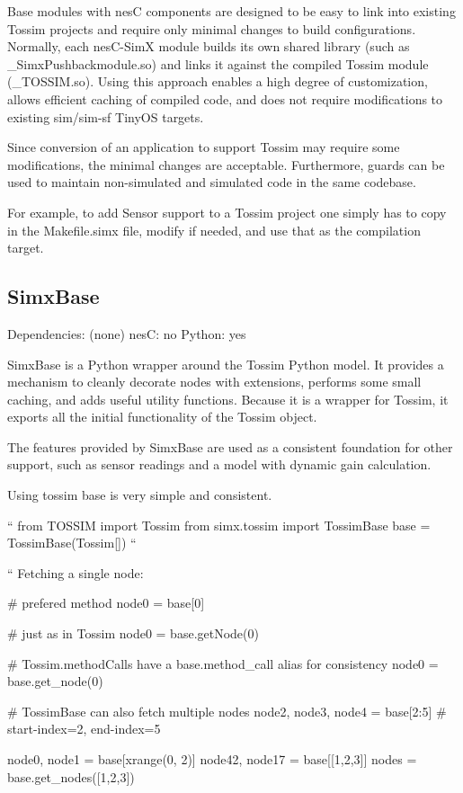 Base modules with nesC components are designed to be easy to link into
existing Tossim projects and require only minimal changes to build
configurations. Normally, each nesC-SimX module builds its own shared
library (such as \_SimxPushbackmodule.so) and links it against the
compiled Tossim module (\_TOSSIM.so). Using this approach enables a
high degree of customization, allows efficient caching of compiled
code, and does not require modifications to existing sim/sim-sf TinyOS
targets.

Since conversion of an application to support Tossim may require some
modifications, the minimal changes are acceptable. Furthermore, guards
can be used to maintain non-simulated and simulated code in the same
codebase.

For example, to add Sensor support to a Tossim project one simply has
to copy in the Makefile.simx file, modify if needed, and use that as
the compilation target.

\subsection{SimxBase}

Dependencies: (none)
nesC: no
Python: yes

SimxBase is a Python wrapper around the Tossim Python model. It
provides a mechanism to cleanly decorate nodes with extensions,
performs some small caching, and adds useful utility
functions. Because it is a wrapper for Tossim, it exports all the
initial functionality of the Tossim object.

The features provided by SimxBase are used as a consistent foundation
for other support, such as sensor readings and a model with dynamic
gain calculation.

Using tossim base is very simple and consistent.

``
from TOSSIM import Tossim
from simx.tossim import TossimBase
base = TossimBase(Tossim[])
``

``
Fetching a single node:

# prefered method
node0 = base[0]

# just as in Tossim
node0 = base.getNode(0)

# Tossim.methodCalls have a base.method_call alias for consistency
node0 = base.get_node(0)

# TossimBase can also fetch multiple nodes
node2, node3, node4 = base[2:5] # start-index=2, end-index=5

node0, node1 = base[xrange(0, 2)]
node42, node17 = base[[1,2,3]]
nodes = base.get_nodes([1,2,3])


